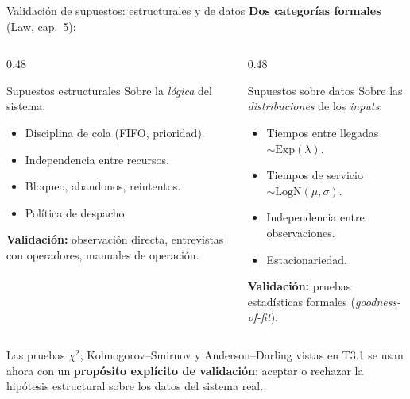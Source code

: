 \documentclass[aspectratio=1610, 10pt]{beamer}
\begin{document}
\begin{frame}{Validación de supuestos: estructurales y de datos}
  \footnotesize
  \textbf{Dos categorías formales} (Law, cap.\ 5):

  \vspace{2pt}
  \begin{columns}[T]
    \begin{column}{0.48\textwidth}
      \begin{block}{Supuestos estructurales}
        \footnotesize
        Sobre la \emph{lógica} del sistema:
        \begin{itemize}\itemsep0pt
          \item Disciplina de cola (FIFO, prioridad).
          \item Independencia entre recursos.
          \item Bloqueo, abandonos, reintentos.
          \item Política de despacho.
        \end{itemize}
        \textbf{Validación:} observación directa, entrevistas con operadores,
        manuales de operación.
      \end{block}
    \end{column}
    \begin{column}{0.48\textwidth}
      \begin{alertblock}{Supuestos sobre datos}
        \footnotesize
        Sobre las \emph{distribuciones} de los \emph{inputs}:
        \begin{itemize}\itemsep0pt
          \item Tiempos entre llegadas $\sim\mathrm{Exp}(\lambda)$.
          \item Tiempos de servicio $\sim\mathrm{LogN}(\mu,\sigma)$.
          \item Independencia entre observaciones.
          \item Estacionariedad.
        \end{itemize}
        \textbf{Validación:} pruebas estadísticas formales
        (\emph{goodness-of-fit}).
      \end{alertblock}
    \end{column}
  \end{columns}

  \vspace{4pt}
  \begin{notabox}
    \footnotesize
    Las pruebas $\chi^2$, Kolmogorov--Smirnov y Anderson--Darling vistas en T3.1
    se usan ahora con un \textbf{propósito explícito de validación}: aceptar o
    rechazar la hipótesis estructural sobre los datos del sistema real.
  \end{notabox}
\end{frame}
\end{document}
